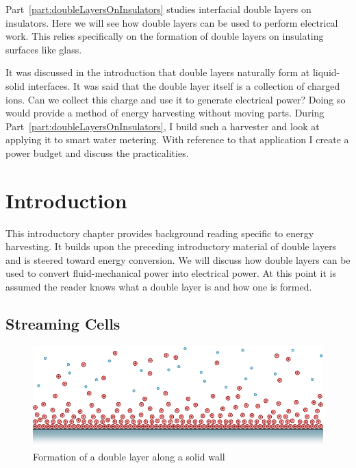 
Part~\ref{part:doubleLayersOnInsulators} studies interfacial double layers on insulators.
Here we will see how double layers can be used to perform electrical work.
This relies specifically on the formation of double layers on insulating surfaces like glass.

It was discussed in the introduction that double layers naturally form at liquid-solid interfaces.
It was said that the double layer itself is a collection of charged ions.
Can we collect this charge and use it to generate electrical power?
Doing so would provide a method of energy harvesting without moving parts.
During Part~\ref{part:doubleLayersOnInsulators}, I build such a harvester and look at applying it to smart water metering.
With reference to that application I create a power budget and discuss the practicalities.

\chapter{Introduction}
  \label{chap:harvesterIntroduction}
  This introductory chapter provides background reading specific to energy harvesting.
  It builds upon the preceding introductory material of double layers and is steered toward energy conversion.
  We will discuss how double layers can be used to convert fluid-mechanical power into electrical power.
  At this point it is assumed the reader knows what a double layer is and how one is formed.

  \section{Streaming Cells}
    \begin{figure}
        \centering
        \includegraphics{content/pt1/01-PowerHarvesting/graphics/intro_2_wall}
        \caption{\label{fig:doubleLayerBetweenWalls}Formation of a double layer along a solid wall}
    \end{figure}

